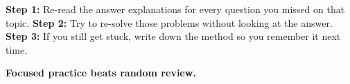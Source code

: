 {\begin{tcolorbox}[
    enhanced,
    colback=funYellowLight,
    colframe=funYellow!60,
    arc=10pt,
    boxrule=1pt,
    left=6mm, right=6mm, top=4mm, bottom=4mm,
]
\vspace{2mm}

\textbf{Step 1:} Re-read the answer explanations for every question you missed on that topic. \textbf{Step 2:} Try to re-solve those problems without looking at the answer. \textbf{Step 3:} If you still get stuck, write down the method so you remember it next time.
\end{tcolorbox}

\vspace{4mm}

\begin{center}
{\large\bfseries\color{funPinkDark} \faCrosshairs\hspace{2mm}Focused practice beats random review.\hspace{2mm}\faCrosshairs}
\end{center}

}
\newpage

